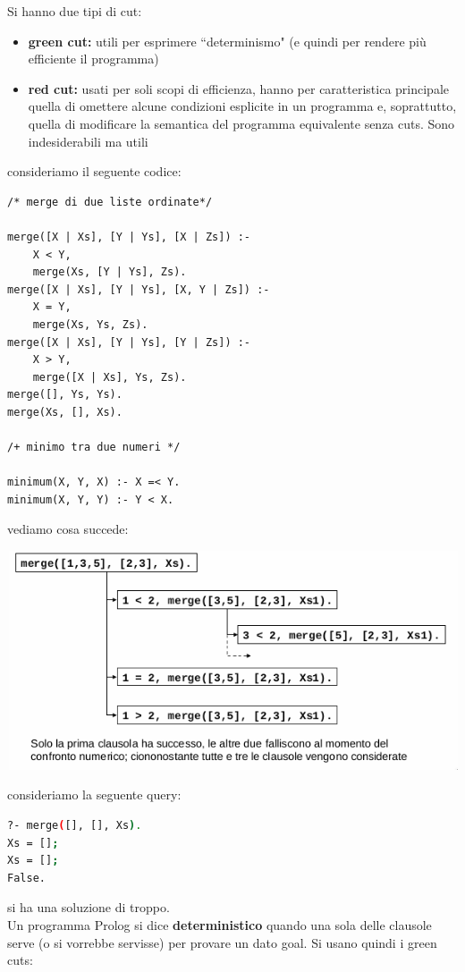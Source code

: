 \documentclass[a4paper,12pt, oneside]{book}
\begin{document}
Si hanno due tipi di cut:
\begin{itemize}
\item \textbf{green cut: } utili per esprimere “determinismo" (e quindi per rendere più efficiente il programma)
\item \textbf{red cut: } usati per soli scopi di efficienza, hanno per caratteristica principale quella di omettere alcune condizioni esplicite in un programma e, soprattutto, quella di modificare la semantica del programma equivalente senza cuts. Sono indesiderabili ma utili
\end{itemize}
consideriamo il seguente codice:
\begin{verbatim}
/* merge di due liste ordinate*/

merge([X | Xs], [Y | Ys], [X | Zs]) :-
	X < Y,
	merge(Xs, [Y | Ys], Zs).
merge([X | Xs], [Y | Ys], [X, Y | Zs]) :-
	X = Y,
	merge(Xs, Ys, Zs).
merge([X | Xs], [Y | Ys], [Y | Zs]) :-
	X > Y,
	merge([X | Xs], Ys, Zs).
merge([], Ys, Ys).
merge(Xs, [], Xs).

/+ minimo tra due numeri */

minimum(X, Y, X) :- X =< Y.
minimum(X, Y, Y) :- Y < X.
\end{verbatim}
vediamo cosa succede:
\begin{center}
\includegraphics[scale=0.8]{img/cut2.png}
\end{center}
consideriamo la seguente query:
\begin{shaded}
\begin{lstlisting}[language=bash]
?- merge([], [], Xs).
Xs = [];
Xs = [];
False.
\end{lstlisting}
\end{shaded}
si ha una soluzione di troppo.\\
Un programma Prolog si dice \textbf{deterministico} quando una sola delle clausole serve (o si vorrebbe servisse) per provare un dato goal. Si usano quindi i green cuts:
\end{document}
